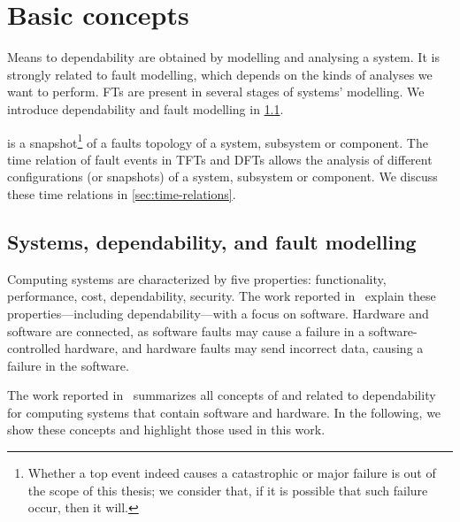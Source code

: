 \chapter{Basic concepts}
\label{chap:basic-concepts}

Means to dependability  are obtained by modelling and analysing a system.
It is strongly related to fault modelling, which depends on the kinds of analyses we want to perform.
\Acp{FT} are present in several stages of systems' modelling.
We introduce dependability and fault modelling in \cref{sec:dependability}.

 is a snapshot\footnote{Whether a top event indeed causes a catastrophic or major failure is out of the scope of this thesis; we consider that, if it is possible that such failure occur, then it will.} of a faults topology of a system, subsystem or component.
The time relation of fault events in \acp{TFT} and \acp{DFT} allows the analysis of different configurations (or snapshots) of a system, subsystem or component.
We discuss these time relations in \cref{sec:time-relations}.

\section{Systems, dependability, and fault modelling}
\label{sec:dependability}

\begin{sloppypar}
Computing systems are characterized by five properties: functionality, performance, cost, dependability, security.
The work reported in~\cite[p. 289--302]{Sommerville2011} explain these properties---including dependability---with a focus on software.
Hardware and software are connected, as software faults may cause a failure in a software-controlled hardware, and hardware faults may send incorrect data, causing a failure in the software.
\end{sloppypar}

The work reported in~\cite{ALR+2004} summarizes all concepts of and related to dependability for computing systems that contain software and hardware.
In the following, we show these concepts and highlight those used in this work.

